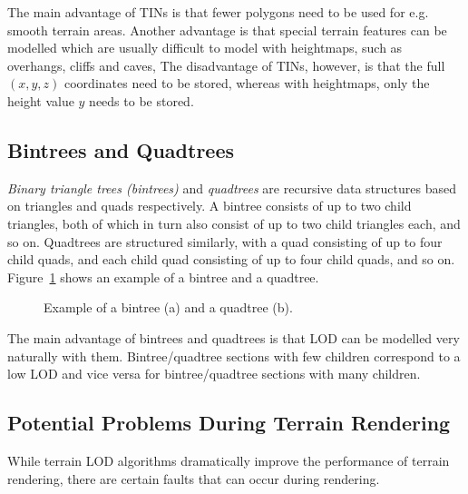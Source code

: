 The main advantage of TINs is that fewer polygons need to be used for 
e.g. smooth terrain areas. Another advantage is that
special terrain features can be modelled 
which are usually difficult to model with heightmaps, such as overhangs, cliffs and caves, 
The disadvantage of TINs, however, is that the full $(x,y,z)$ coordinates need to be stored,
whereas with heightmaps, only the height value $y$ needs to be stored.

\subsection{Bintrees and Quadtrees}
\textit{Binary triangle trees (bintrees)} and \textit{quadtrees} are 
recursive data structures based on triangles and quads respectively.
A bintree consists of up to two child triangles, both of which in turn also consist of up to two child triangles each, and so on.
Quadtrees are structured similarly, with a quad consisting of up to four child quads, and each child quad consisting
of up to four child quads, and so on.
Figure~\ref{fig:bintree-quadtree-example} shows an example of a bintree and a quadtree.

\begin{figure}[H]
  \centering
  \qquad
  \caption{Example of a bintree (a) and a quadtree (b).}\label{fig:bintree-quadtree-example}
\end{figure}

The main advantage of bintrees and quadtrees is that 
LOD can be modelled very naturally with them.
Bintree/quadtree sections with few children correspond to a low LOD and 
vice versa for bintree/quadtree sections with many children.

\subsection{Potential Problems During Terrain Rendering}
While terrain LOD algorithms dramatically improve the performance of terrain rendering, 
there are certain faults that can occur during rendering. 

